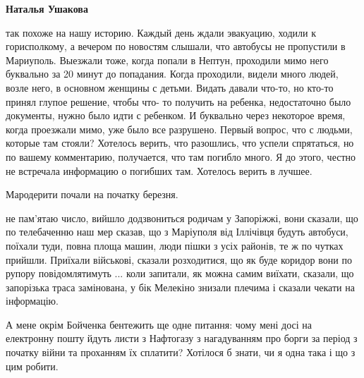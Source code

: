 \begin{itemize}
\textbf{Наталья Ушакова} 

так похоже на нашу историю. Каждый день ждали эвакуацию, ходили к горисполкому,
а вечером по новостям слышали, что автобусы не пропустили в Мариуполь. Выезжали
тоже, когда попали в Нептун, проходили мимо него буквально за 20 минут до
попадания. Когда проходили, видели много людей, возле него, в основном женщины
с детьми. Видать давали что-то, но кто-то принял глупое решение, чтобы что- то
получить на ребенка, недостаточно было документы, нужно было идти с ребенком. И
буквально через некоторое время, когда проезжали мимо, уже было все разрушено.
Первый вопрос, что с людьми, которые там стояли? Хотелось верить, что
разошлись, что успели спрятаться, но по вашему комментарию, получается, что
там погибло много. Я до этого, честно не встречала информацию о погибших там.
Хотелось верить в лучшее.

\end{itemize} %


Мародерити почали на початку березня.


не пам'ятаю число, вийшло додзвониться родичам у Запоріжжі, вони сказали, що по
телебаченню наш мер сказав, що з Маріуполя від Іллічівця будуть автобуси,
поїхали туди, повна площа машин, люди пішки з усіх районів, те ж по чутках
прийшли. Приїхали військові, сказали розходитися, що як буде коридор вони по
рупору повідомлятимуть ... коли запитали, як можна самим виїхати, сказали, що
запорізька траса замінована, у бік Мелекіно знизали плечима і сказали чекати на
інформацію.


А мене окрім Бойченка бентежить ще одне питання: чому мені досі на електронну
пошту йдуть листи з Нафтогазу з нагадуванням про борги за період з початку
війни та проханням їх сплатити? Хотілося б знати, чи я одна така і що з цим
робити.

